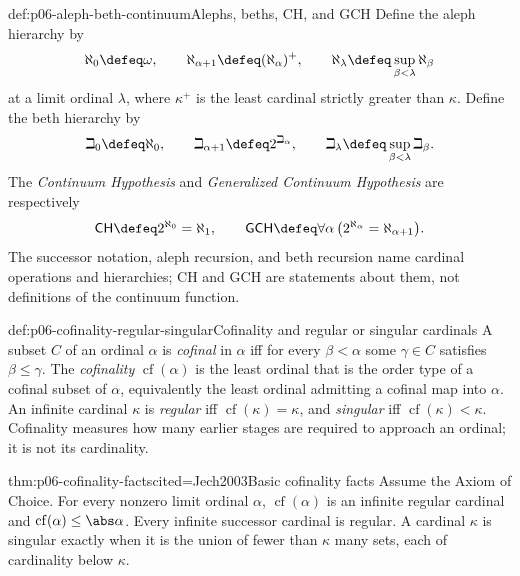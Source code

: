 \begin{hbdefinition}{def:p06-aleph-beth-continuum}{Alephs, beths, CH, and GCH}
Define the aleph hierarchy by
\[
  \aleph_0\defeq\omega,\qquad
  \aleph_{\alpha+1}\defeq(\aleph_\alpha)^+,
  \qquad
  \aleph_\lambda\defeq\sup_{\beta<\lambda}\aleph_\beta
\]
at a limit ordinal \(\lambda\), where \(\kappa^+\) is the least cardinal
strictly greater than \(\kappa\).  Define the beth hierarchy by
\[
  \beth_0\defeq\aleph_0,\qquad
  \beth_{\alpha+1}\defeq2^{\beth_\alpha},
  \qquad
  \beth_\lambda\defeq\sup_{\beta<\lambda}\beth_\beta.
\]
The \emph{Continuum Hypothesis} and \emph{Generalized Continuum Hypothesis}
are respectively
\[
  \mathsf{CH}\defeq2^{\aleph_0}=\aleph_1,
  \qquad
  \mathsf{GCH}\defeq
  \forall\alpha\,\bigl(2^{\aleph_\alpha}=\aleph_{\alpha+1}\bigr).
\]
The successor notation, aleph recursion, and beth recursion name cardinal
operations and hierarchies; CH and GCH are statements about them, not
definitions of the continuum function.
\end{hbdefinition}

\begin{hbdefinition}{def:p06-cofinality-regular-singular}{Cofinality and regular or singular cardinals}
A subset \(C\) of an ordinal \(\alpha\) is \emph{cofinal} in \(\alpha\) iff
for every \(\beta<\alpha\) some \(\gamma\in C\) satisfies
\(\beta\leq\gamma\).  The \emph{cofinality} \(\operatorname{cf}(\alpha)\)
is the least ordinal that is the order type of a cofinal subset of \(\alpha\),
equivalently the least ordinal admitting a cofinal map into \(\alpha\).
An infinite cardinal \(\kappa\) is \emph{regular} iff
\(\operatorname{cf}(\kappa)=\kappa\), and \emph{singular} iff
\(\operatorname{cf}(\kappa)<\kappa\).  Cofinality measures how many earlier
stages are required to approach an ordinal; it is not its cardinality.
\end{hbdefinition}

\begin{hbtheorem}{thm:p06-cofinality-facts}{cited=Jech2003}{Basic cofinality facts}
Assume the Axiom of Choice.  For every nonzero limit ordinal \(\alpha\),
\(\operatorname{cf}(\alpha)\) is an infinite regular cardinal and
\(\operatorname{cf}(\alpha)\leq\abs\alpha\).  Every infinite successor
cardinal is regular.  A cardinal \(\kappa\) is singular exactly when it is the
union of fewer than \(\kappa\) many sets, each of cardinality below
\(\kappa\).
\end{hbtheorem}

